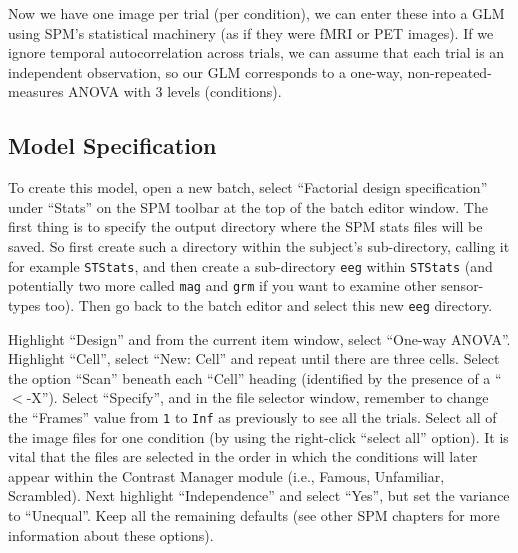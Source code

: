 Now we have one image per trial (per condition), we can enter these into a GLM using SPM's statistical machinery (as if they were fMRI or PET images). If we ignore temporal autocorrelation across trials, we can assume that each trial is an independent observation, so our GLM corresponds to a one-way, non-repeated-measures ANOVA with 3 levels (conditions).

\subsection{Model Specification}

To create this model, open a new batch, select ``Factorial design specification'' under ``Stats'' on the SPM toolbar at the top of the batch editor window. The first thing is to specify the output directory where the SPM stats files will be saved. So first create such a directory within the subject's sub-directory, calling it for example \texttt{STStats}, and then create a sub-directory \texttt{eeg} within \texttt{STStats} (and potentially two more called \texttt{mag} and \texttt{grm} if you want to examine other sensor-types too). Then go back to the batch editor and select this new \texttt{eeg} directory.

Highlight ``Design'' and from the current item window, select ``One-way ANOVA''. Highlight ``Cell'',  select ``New: Cell'' and repeat until there are three cells. Select the option ``Scan'' beneath each ``Cell'' heading (identified by the presence of a ``\(<\)-X''). Select ``Specify'', and in the file selector window, remember to change the ``Frames'' value from \texttt{1} to \texttt{Inf} as previously to see all the trials. Select all of the image files for one condition (by using the right-click ``select all'' option).  It is vital that the files are selected in the order in which the conditions will later appear within the Contrast Manager module (i.e., Famous, Unfamiliar, Scrambled). Next highlight ``Independence'' and select ``Yes'', but set the variance to ``Unequal''. Keep all the remaining defaults (see other SPM chapters for more information about these options).

